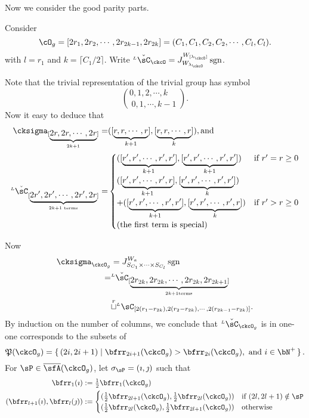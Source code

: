 \documentclass[12pt,a4paper]{amsart}
\newcommand{\CQ}{{\mathcal {Q}}}
\newcommand{\sgn}{\operatorname{sgn}}
\numberwithin{equation}{section}
\theoremstyle{remark}
\def\half{{\tfrac{1}{2}}}
\def\floor#1{{\lfloor #1 \rfloor}}
\def\lamck{\lambda_\ckcO}
\def\LC{{}^{\scriptscriptstyle L}\sC}
\def\ckLC{{}^{\scriptscriptstyle L}\check{\sC}}
\def\cuprow{{\stackrel{r}{\sqcup}}}
\def\CQ{\overline{\sfA}}%
\def\CPP{\mathfrak{P}}
\def\ceil#1{\lceil #1 \rceil}
\begin{document}
{Now we consider the good parity parts.


Consider
\[
\cO_{g} = [2r_{1},2r_{2}, \cdots, 2r_{2k-1},2r_{2k}]
= (C_{1},C_{1}, C_{2},C_{2},\cdots, C_{l}, C_{l}).
\]
with $l = r_{1}$ and $k = \ceil{C_{1}/2}$.
Write  $\ckLC_{\ckcO} = J_{W_{\lamck}}^{W_{[\lamck]}}\sgn$.



Note that the trivial representation of the trivial group has symbol
\[
\binom{0,1, 2, \cdots, k\phantom{-1}}{0,1, \cdots, k-1}.
\]
Now it easy to deduce that
\[
\begin{split}
\cksigma_{[\underbrace{2r,2r, \cdots, 2r}_{2k+1}]}
=& ([\underbrace{r,r, \cdots, r}_{k+1}], [\underbrace{r,r, \cdots, r}_{k}]),
\text{and}\\
\ckLC_{[\underbrace{2r',2r', \cdots, 2r',2r}_{2k+1\text{ terms}}]}
=&
\begin{cases}
  ([\underbrace{r',r', \cdots, r',r'}_{k+1}], [\underbrace{r',r', \cdots, r',r'}_{k+1}]) &
  \text{if } r'=r\geq 0 \\
  ([\underbrace{r',r', \cdots, r',r}_{k+1}], [\underbrace{r',r', \cdots, r',r'}_{k}]) &\\
 +([\underbrace{r',r', \cdots, r',r'}_{k+1}], [\underbrace{r',r', \cdots, r',r}_{k}]) &
  \text{if } r'>r \geq 0\\
 \text{(the first term is special)}& \\
\end{cases}
\end{split}
\]

Now
\[
  \begin{split}
    \cksigma_{\ckcO_{g}} & =
    J_{S_{C_{1}}\times \cdots \times S_{C_{l}}}^{W_{a}} \sgn\\
    =& \ckLC_{[\underbrace{2r_{2k},2r_{2k}, \cdots,2r_{2k},2r_{2k+1}}_{2k+1\text{terms}}]}\\
    & \cuprow \LC_{[2(r_{1}-r_{2k}), 2(r_{2}-r_{2k}), \cdots, 2(r_{2k-1}-r_{2k})]}.
  \end{split}
\]
By induction on the number of columns, we conclude that $\ckLC_{\ckcO_{g}}$ is in one-one corresponds to
the subsets of
\[
\CPP(\ckcO_{g}) = \set{(2i,2i+1)| \bfrr_{2i+1}(\ckcO_{g})> \bfrr_{2i}(\ckcO_{g}), \text{ and
  } i\in \bN^{+}}.
\]
For $\sP\in \CQ(\ckcO_{g})$, let $\sigma_{\sP} = (\imath,\jmath)$
such that
\[
\begin{split}
  \bfrr_{1}(\imath) &:= \half \bfrr_{1}(\ckcO_{g})\\
  (\bfrr_{l+1}(\imath), \bfrr_{l}(\jmath))&:=
  \begin{cases}
    (\half \bfrr_{2l+1}(\ckcO_{g}), \half \bfrr_{2l}(\ckcO_{g}))
    & \text{if } (2l,2l+1)\notin \sP\\
    (\half \bfrr_{2l}(\ckcO_{g}), \half \bfrr_{2l+1}(\ckcO_{g}))
    & \text{otherwise}
  \end{cases}
\end{split}
\]


}
\end{document}
